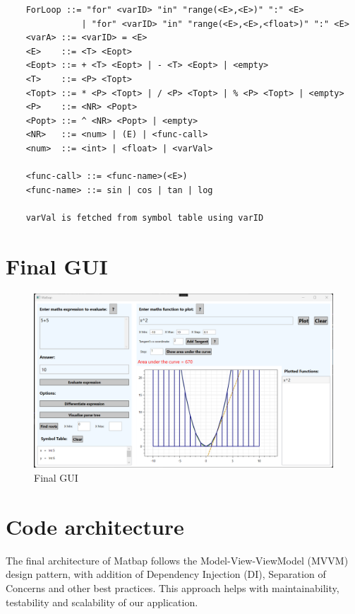 \documentclass[a4paper, oneside, 11pt]{report}
\begin{document}
\begin{verbatim}
    ForLoop ::= "for" <varID> "in" "range(<E>,<E>)" ":" <E>
               | "for" <varID> "in" "range(<E>,<E>,<float>)" ":" <E>
    <varA> ::= <varID> = <E>
    <E>    ::= <T> <Eopt>
    <Eopt> ::= + <T> <Eopt> | - <T> <Eopt> | <empty>
    <T>    ::= <P> <Topt>
    <Topt> ::= * <P> <Topt> | / <P> <Topt> | % <P> <Topt> | <empty>
    <P>    ::= <NR> <Popt>
    <Popt> ::= ^ <NR> <Popt> | <empty>
    <NR>   ::= <num> | (E) | <func-call>
    <num>  ::= <int> | <float> | <varVal>

    <func-call> ::= <func-name>(<E>)
    <func-name> ::= sin | cos | tan | log

    varVal is fetched from symbol table using varID
\end{verbatim}
    

\section{Final GUI}
\begin{figure}[H]
\begin{center}
\includegraphics[scale=0.4]{FinalGUI.png}
\caption{Final GUI}
\label{basicgui}
\end{center}
\end{figure}

\section{Code architecture}
\label{code-arch}
The final architecture of Matbap follows the Model-View-ViewModel (MVVM) design pattern, with addition of Dependency Injection (DI), Separation of Concerns and other best practices. This approach helps with maintainability, testability and scalability of our application.
\end{document}
